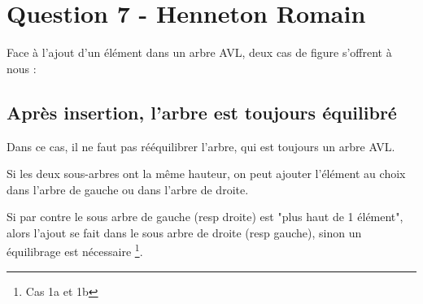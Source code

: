 \documentclass[10pt,a4paper]{article}
\begin{document}
\section*{Question 7 - Henneton Romain}
Face à l'ajout d'un élément dans un arbre AVL, deux cas de figure s'offrent à nous :
\subsection*{Après insertion, l'arbre est toujours équilibré}
Dans ce cas, il ne faut pas rééquilibrer l'arbre, qui est toujours un arbre AVL. 

Si les deux sous-arbres ont la même hauteur, on peut ajouter l'élément au choix dans l'arbre de gauche ou dans l'arbre de droite.

Si par contre le sous arbre de gauche (resp droite) est "plus haut de 1 élément", alors l'ajout se fait dans le sous arbre de droite (resp gauche), sinon un équilibrage est nécessaire \footnote{Cas 1a et 1b}.
\end{document}
